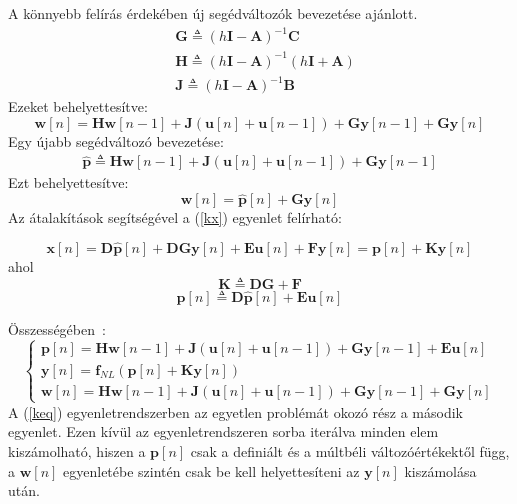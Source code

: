 A könnyebb felírás érdekében új segédváltozók bevezetése ajánlott.
\begin{eqnarray}
    &\mathbf{G} \triangleq {(h\mathbf{I}-\mathbf{A})}^{-1}\mathbf{C}
   \label{G}\\
    &\mathbf{H} \triangleq {(h\mathbf{I}-\mathbf{A})}^{-1}(h\mathbf{I}+\mathbf{A})
   \label{H}\\
    &\mathbf{J} \triangleq {(h\mathbf{I}-\mathbf{A})}^{-1}\mathbf{B}
   \label{J}
\end{eqnarray}
Ezeket behelyettesítve:
\begin{equation}
    \mathbf{w}[n]=\mathbf{Hw}[n-1]+\mathbf{J}(\mathbf{u}[n]+\mathbf{u}[n-1])+\mathbf{Gy}[n-1]+\mathbf{Gy}[n]
\end{equation}
Egy újabb segédváltozó bevezetése:
\begin{eqnarray}
    \mathbf{\hat{p}} \triangleq \mathbf{Hw}[n-1]+\mathbf{J}(\mathbf{u}[n]+\mathbf{u}[n-1])+\mathbf{Gy}[n-1]
   \label{pk}
\end{eqnarray}
Ezt behelyettesítve:
\begin{equation}
    \mathbf{w}[n]=\mathbf{\hat{p}}[n]+\mathbf{Gy}[n]
   \label{wn}
\end{equation}
Az átalakítások segítségével a (\ref{kx}) egyenlet felírható:

\begin{equation}
    \mathbf{x}[n]=\mathbf{D\hat{p}}[n]+\mathbf{DGy}[n]+\mathbf{Eu}[n]+\mathbf{Fy}[n] = \mathbf{p}[n]+\mathbf{Ky}[n]
\end{equation}
ahol
\begin{equation}
    \mathbf{K} \triangleq \mathbf{DG}+\mathbf{F}
   \label{K}
\end{equation}
\begin{equation}
    \mathbf{p}[n] \triangleq \mathbf{D\hat{p}}[n]+\mathbf{Eu}[n]
\end{equation}

Összességében~\cite{borin}:
\begin{equation}
    \begin{cases}
        \mathbf{p}[n]=\mathbf{Hw}[n-1]+\mathbf{J}(\mathbf{u}[n]+\mathbf{u}[n-1])+\mathbf{Gy}[n-1]+\mathbf{Eu}[n] \\
        \mathbf{y}[n]=\mathbf{f}_{NL}(\mathbf{p}[n]+\mathbf{Ky}[n]) \\
        \mathbf{w}[n]=\mathbf{Hw}[n-1]+\mathbf{J}(\mathbf{u}[n]+\mathbf{u}[n-1])+\mathbf{Gy}[n-1]+\mathbf{Gy}[n]
    \end{cases}
   \label{keq}
\end{equation}
A (\ref{keq}) egyenletrendszerben az egyetlen problémát okozó rész a második egyenlet. 
Ezen kívül az egyenletrendszeren sorba iterálva minden elem kiszámolható, hiszen a $\mathbf{p}[n]$ 
csak a definiált és a múltbéli változóértékektől függ, a $\mathbf{w}[n]$ egyenletébe szintén csak be 
kell helyettesíteni az $\mathbf{y}[n]$ kiszámolása után.

